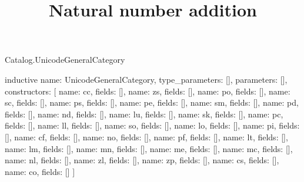 \begin{lexlean}{Catalog.UnicodeGeneralCategory}
\title{Natural number addition}
\begin{semanticmodule}
inductive{
  name: UnicodeGeneralCategory,
  type_parameters: [],
  parameters: [],
  constructors: [
    {name: cc, fields: []},
    {name: zs, fields: []},
    {name: po, fields: []},
    {name: sc, fields: []},
    {name: ps, fields: []},
    {name: pe, fields: []},
    {name: sm, fields: []},
    {name: pd, fields: []},
    {name: nd, fields: []},
    {name: lu, fields: []},
    {name: sk, fields: []},
    {name: pc, fields: []},
    {name: ll, fields: []},
    {name: so, fields: []},
    {name: lo, fields: []},
    {name: pi, fields: []},
    {name: cf, fields: []},
    {name: no, fields: []},
    {name: pf, fields: []},
    {name: lt, fields: []},
    {name: lm, fields: []},
    {name: mn, fields: []},
    {name: me, fields: []},
    {name: mc, fields: []},
    {name: nl, fields: []},
    {name: zl, fields: []},
    {name: zp, fields: []},
    {name: cs, fields: []},
    {name: co, fields: []}
  ]
}
\end{semanticmodule}
\end{lexlean}
